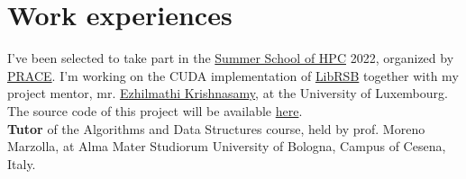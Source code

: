 \documentclass[curriculum-vitae-eng]{subfiles}
\begin{document}
	\section*{Work experiences}
	 I've been selected to take part in the \href{https://summerofhpc.prace-ri.eu/info/}{Summer School of HPC} 2022, organized by \href{https://prace-ri.eu/}{PRACE}. I'm working on the CUDA implementation of \href{http://librsb.sourceforge.net/}{LibRSB} together with my project mentor, mr. \href{https://wwwen.uni.lu/snt/people/ezhilmathi_krishnasamy}{Ezhilmathi Krishnasamy}, at the University of Luxembourg. The source code of this project will be available \href{https://github.com/Ledmington/cuRSB}{here}.\\
	
	 \textbf{Tutor} of the Algorithms and Data Structures course, held by prof. Moreno Marzolla, at Alma Mater Studiorum University of Bologna, Campus of Cesena, Italy.
\end{document}

